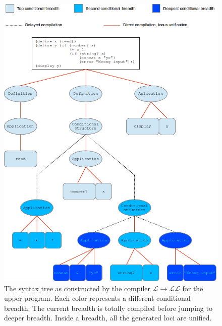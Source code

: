 \documentclass[a4paper]{report}
\newcommand{\lang}[0]{\mathcal{L}}
\begin{document}
\begin{figure}
\centering
\includegraphics{images/synt_tree.png}
\caption{The syntax tree as constructed by the compiler $\lang\to\lang\lang$ for the upper program. Each color represents a different conditional breadth. The current breadth is totally compiled before jumping to deeper breadth. Inside a breadth, all the generated loci are unified.}
\label{synt_tree}
\end{figure}
\end{document}
